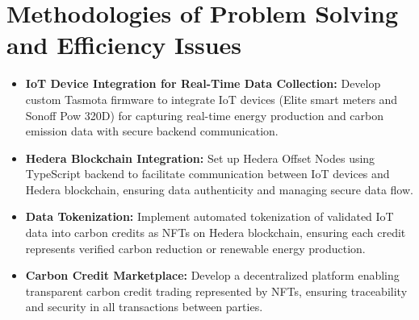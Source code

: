 \documentclass[oneside,a4paper,12pt]{book}
\begin{document}
\section{Methodologies of Problem Solving and Efficiency Issues}
\begin{itemize}
\item \textbf{IoT Device Integration for Real-Time Data Collection:} Develop custom Tasmota firmware to integrate IoT devices (Elite smart meters and Sonoff Pow 320D) for capturing real-time energy production and carbon emission data with secure backend communication.

\item \textbf{Hedera Blockchain Integration:} Set up Hedera Offset Nodes using TypeScript backend to facilitate communication between IoT devices and Hedera blockchain, ensuring data authenticity and managing secure data flow.

\item \textbf{Data Tokenization:} Implement automated tokenization of validated IoT data into carbon credits as NFTs on Hedera blockchain, ensuring each credit represents verified carbon reduction or renewable energy production.

\item \textbf{Carbon Credit Marketplace:} Develop a decentralized platform enabling transparent carbon credit trading represented by NFTs, ensuring traceability and security in all transactions between parties.
\end{itemize}
\end{document}
